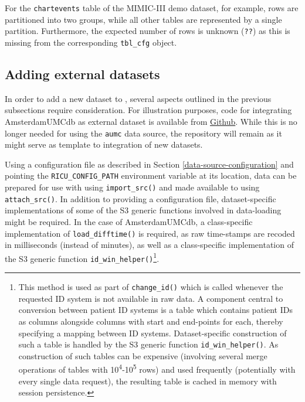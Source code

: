 \documentclass[
  notitle]{jss}
\begin{document}
For the \texttt{chartevents} table of the MIMIC-III demo dataset, for
example, rows are partitioned into two groups, while all other tables
are represented by a single partition. Furthermore, the expected number
of rows is unknown (\texttt{??}) as this is missing from the
corresponding \texttt{tbl\_cfg} object.

\hypertarget{adding-external-datasets}{%
\subsection{Adding external datasets}\label{adding-external-datasets}}

In order to add a new dataset to , several aspects outlined in
the previous subsections require consideration. For illustration
purposes, code for integrating AmsterdamUMCdb as external dataset is
available from \href{https://github.com/eth-mds/aumc}{Github}. While
this is no longer needed for using the \texttt{aumc} data source, the
repository will remain as it might serve as template to integration of
new datasets.

Using a configuration file as described in Section
\ref{data-source-configuration} and pointing the
\texttt{RICU\_CONFIG\_PATH} environment variable at its location, data
can be prepared for use with  using \texttt{import\_src()} and
made available to  using \texttt{attach\_src()}. In addition
to providing a configuration file, dataset-specific implementations of
some of the S3 generic functions involved in data-loading might be
required. In the case of AmsterdamUMCdb, a class-specific implementation
of \texttt{load\_difftime()} is required, as raw time-stamps are recoded
in milliseconds (instead of minutes), as well as a class-specific
implementation of the S3 generic function
\texttt{id\_win\_helper()}\footnote{This method is used as part of
  \texttt{change\_id()} which is called whenever the requested ID system
  is not available in raw data. A component central to conversion
  between patient ID systems is a table which contains patient IDs as
  columns alongside columns with start and end-points for each, thereby
  specifying a mapping between ID systems. Dataset-specific construction
  of such a table is handled by the S3 generic function
  \texttt{id\_win\_helper()}. As construction of such tables can be
  expensive (involving several merge operations of tables with
  10\textsuperscript{4}-10\textsuperscript{5} rows) and used frequently
  (potentially with every single data request), the resulting table is
  cached in memory with session persistence.}.
\end{document}
